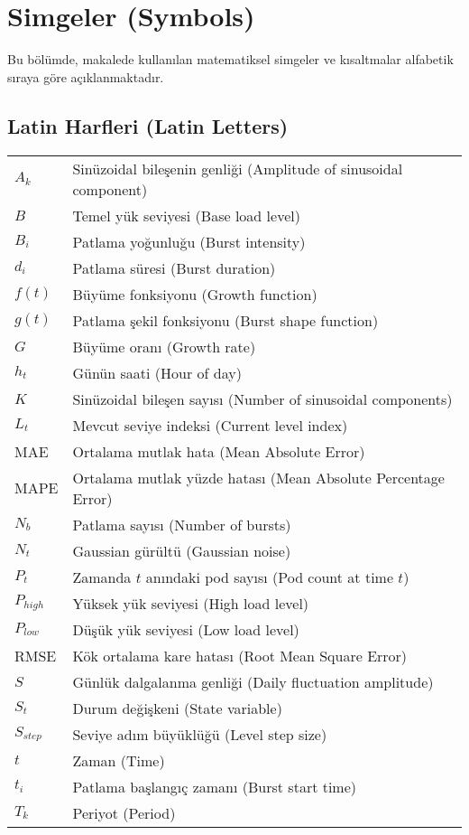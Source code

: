 
\section{Simgeler (Symbols)}

Bu bölümde, makalede kullanılan matematiksel simgeler ve kısaltmalar alfabetik sıraya göre açıklanmaktadır.

\subsection{Latin Harfleri (Latin Letters)}

\begin{tabular}{ll}
$A_k$ & Sinüzoidal bileşenin genliği (Amplitude of sinusoidal component) \\
$B$ & Temel yük seviyesi (Base load level) \\
$B_i$ & Patlama yoğunluğu (Burst intensity) \\
$d_i$ & Patlama süresi (Burst duration) \\
$f(t)$ & Büyüme fonksiyonu (Growth function) \\
$g(t)$ & Patlama şekil fonksiyonu (Burst shape function) \\
$G$ & Büyüme oranı (Growth rate) \\
$h_t$ & Günün saati (Hour of day) \\
$K$ & Sinüzoidal bileşen sayısı (Number of sinusoidal components) \\
$L_t$ & Mevcut seviye indeksi (Current level index) \\
MAE & Ortalama mutlak hata (Mean Absolute Error) \\
MAPE & Ortalama mutlak yüzde hatası (Mean Absolute Percentage Error) \\
$N_b$ & Patlama sayısı (Number of bursts) \\
$N_t$ & Gaussian gürültü (Gaussian noise) \\
$P_t$ & Zamanda $t$ anındaki pod sayısı (Pod count at time $t$) \\
$P_{high}$ & Yüksek yük seviyesi (High load level) \\
$P_{low}$ & Düşük yük seviyesi (Low load level) \\
RMSE & Kök ortalama kare hatası (Root Mean Square Error) \\
$S$ & Günlük dalgalanma genliği (Daily fluctuation amplitude) \\
$S_t$ & Durum değişkeni (State variable) \\
$S_{step}$ & Seviye adım büyüklüğü (Level step size) \\
$t$ & Zaman (Time) \\
$t_i$ & Patlama başlangıç zamanı (Burst start time) \\
$T_k$ & Periyot (Period) \\
\end{tabular}

